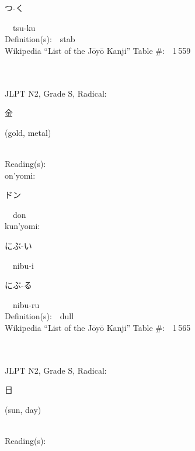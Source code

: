\begin{multicols}{2}
{\hspace*{2em}}{\begin{CJK}{UTF8}{min} つ-く \end{CJK}}\ \ tsu-ku\ \ \\
Definition(s):\ \ stab \\
Wikipedia ``List of the J\=oy\=o Kanji'' Table \#:\ \ 1\,559 \\
\ \ \\
{\fontsize{34pt}{40pt}  }\ \ \\  %
{JLPT N2, Grade S, Radical:\ \ {\begin{CJK}{UTF8}{min} 金 \end{CJK}} (gold, metal) } \\
Reading(s):\ \ \\
{\hspace*{1em}}on'yomi:\ \ \\
{\hspace*{2em}}{\begin{CJK}{UTF8}{min} ドン \end{CJK}}\ \ don\ \ \\
{\hspace*{1em}}kun'yomi:\ \ \\
{\hspace*{2em}}{\begin{CJK}{UTF8}{min} にぶ-い \end{CJK}}\ \ nibu-i\ \ \\
{\hspace*{2em}}{\begin{CJK}{UTF8}{min} にぶ-る \end{CJK}}\ \ nibu-ru\ \ \\
Definition(s):\ \ dull \\
Wikipedia ``List of the J\=oy\=o Kanji'' Table \#:\ \ 1\,565 \\
\ \ \\
{\fontsize{34pt}{40pt}  }\ \ \\  %
{JLPT N2, Grade S, Radical:\ \ {\begin{CJK}{UTF8}{min} 日 \end{CJK}} (sun, day) } \\
Reading(s):\ \ \\

\end{multicols}
